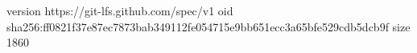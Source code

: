 version https://git-lfs.github.com/spec/v1
oid sha256:ff0821f37e87ec7873bab349112fe054715e9bb651ecc3a65bfe529cdb5dcb9f
size 1860
